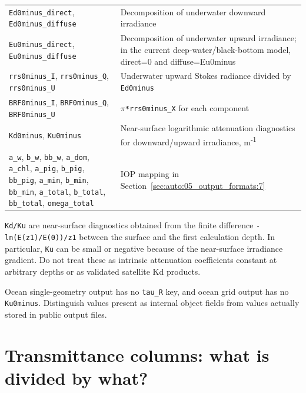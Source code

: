 {\begin{longtable}{@{}>{\raggedright\arraybackslash}p{}>{\raggedright\arraybackslash}p{}@{}}
\texttt{Ed0minus\_\allowbreak{}direct}, \texttt{Ed0minus\_\allowbreak{}diffuse} & Decomposition of underwater downward irradiance \\
\texttt{Eu0minus\_\allowbreak{}direct}, \texttt{Eu0minus\_\allowbreak{}diffuse} & Decomposition of underwater upward irradiance; in the current deep-water/black-bottom model, direct=0 and diffuse=Eu0minus \\
\texttt{rrs0minus\_\allowbreak{}I}, \texttt{rrs0minus\_\allowbreak{}Q}, \texttt{rrs0minus\_\allowbreak{}U} & Underwater upward Stokes radiance divided by \texttt{Ed0minus} \\
\texttt{BRF0minus\_\allowbreak{}I}, \texttt{BRF0minus\_\allowbreak{}Q}, \texttt{BRF0minus\_\allowbreak{}U} & \texttt{\ensuremath{\pi}*rrs0minus\_\allowbreak{}X} for each component \\
\texttt{Kd0minus}, \texttt{Ku0minus} & Near-surface logarithmic attenuation diagnostics for downward/upward irradiance, m\textsuperscript{-}\textsuperscript{1} \\
\texttt{a\_\allowbreak{}w}, \texttt{b\_\allowbreak{}w}, \texttt{bb\_\allowbreak{}w}, \texttt{a\_\allowbreak{}dom}, \texttt{a\_\allowbreak{}chl}, \texttt{a\_\allowbreak{}pig}, \texttt{b\_\allowbreak{}pig}, \texttt{bb\_\allowbreak{}pig}, \texttt{a\_\allowbreak{}min}, \texttt{b\_\allowbreak{}min}, \texttt{bb\_\allowbreak{}min}, \texttt{a\_\allowbreak{}total}, \texttt{b\_\allowbreak{}total}, \texttt{bb\_\allowbreak{}total}, \texttt{omega\_\allowbreak{}total} & IOP mapping in Section~\ref{sec:auto:05_output_formats:7} \\
\end{longtable}
}

\texttt{Kd/\allowbreak{}Ku} are near-surface diagnostics obtained from the finite difference \texttt{-ln(E(z1)/\allowbreak{}E(0))/\allowbreak{}z1} between the surface and the first calculation depth. In particular, \texttt{Ku} can be small or negative because of the near-surface irradiance gradient. Do not treat these as intrinsic attenuation coefficients constant at arbitrary depths or as validated satellite Kd products.

Ocean single-geometry output has no \texttt{tau\_\allowbreak{}R} key, and ocean grid output has no \texttt{Ku0minus}. Distinguish values present as internal object fields from values actually stored in public output files.

\section{Transmittance columns: what is divided by what?}
\label{sec:auto:05_output_formats:5}

